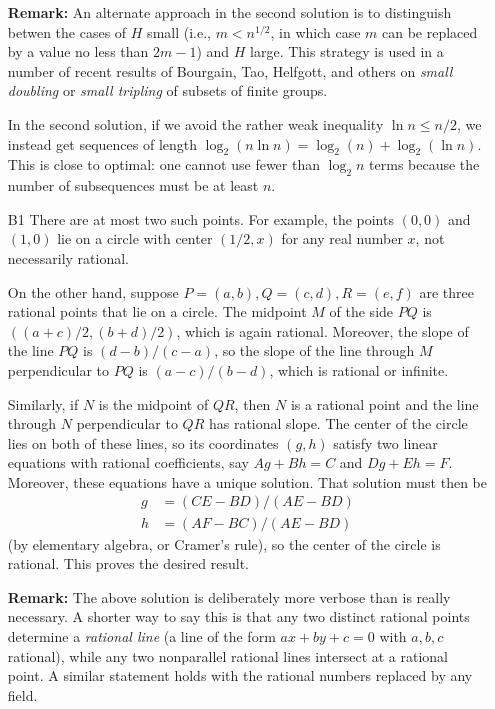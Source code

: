 \documentclass[amssymb,twocolumn,pra,10pt,aps]{revtex4-1}
\begin{document}
\begin{itemize}
\textbf{Remark:} An alternate approach in the second solution
is to distinguish betwen the cases of $H$ small (i.e.,
$m < n^{1/2}$, in which case $m$ can be replaced by a value
no less than $2m-1$) and $H$ large.
This strategy is used in a number of recent results
of Bourgain, Tao, Helfgott, and others on \emph{small doubling}
or \emph{small tripling}
of subsets of finite groups.

In the second solution, if we avoid the rather weak inequality
$\ln n \leq n/2$, we instead get sequences of length
$\log_2 (n \ln n) = \log_2(n) + \log_2 (\ln n)$.
This is close to optimal: one cannot use fewer than $\log_2 n$
terms because the number of subsequences must be at least $n$.

\item[B1]
There are at most two such points. For example,
the points $(0,0)$ and $(1,0)$ lie on a circle with center
$(1/2, x)$ for any real number $x$, not necessarily rational.

On the other hand, suppose $P = (a,b), Q = (c,d), R = (e,f)$
are three rational points that lie
on a circle. The midpoint $M$ of the side $PQ$ is
$((a+c)/2, (b+d)/2)$, which is again rational. Moreover, the slope
of the line $PQ$ is $(d-b)/(c-a)$, so the slope of the line through
$M$ perpendicular to $PQ$ is $(a-c)/(b-d)$, which is rational or infinite.

Similarly, if $N$ is the midpoint of $QR$, then $N$ is a rational point
and the line through $N$ perpendicular to $QR$ has rational slope.
The center of the circle lies on both of these lines, so its
coordinates $(g,h)$ satisfy two linear equations with rational
coefficients, say $Ag + Bh = C$ and $Dg + Eh = F$. Moreover,
these equations have a unique solution. That solution must then be
\begin{align*}
g &= (CE - BD)/(AE - BD) \\
h &= (AF - BC)/(AE - BD)
\end{align*}
(by elementary algebra, or Cramer's rule),
so the center of the circle is rational. This proves the desired result.

\textbf{Remark:} The above solution is deliberately more verbose
than is really necessary. A shorter way to say this is that any two distinct
rational points determine a \emph{rational line}
(a line of the form $ax + by + c = 0$ with $a,b,c$ rational),
while any two nonparallel rational lines intersect at a rational point.
A similar statement holds with the rational numbers replaced by any
field.


\end{itemize}
\end{document}
